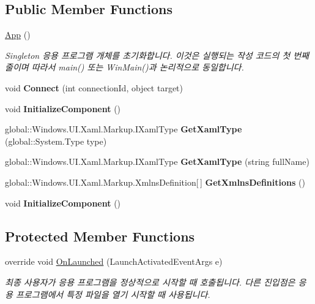 \subsection*{Public Member Functions}
\begin{DoxyCompactItemize}
\item 
\hyperlink{a00015_a1719bb741c5cfb24b6745cd2b9172bd8}{App} ()
\begin{DoxyCompactList}\small\item\em Singleton 응용 프로그램 개체를 초기화합니다. 이것은 실행되는 작성 코드의 첫 번째 줄이며 따라서 main() 또는 Win\+Main()과 논리적으로 동일합니다. \end{DoxyCompactList}\item 
void {\bfseries Connect} (int connection\+Id, object target)\hypertarget{a00015_aa0b90b9ef72df1b4b04b989765843170}{}\label{a00015_aa0b90b9ef72df1b4b04b989765843170}

\item 
void {\bfseries Initialize\+Component} ()\hypertarget{a00015_a8956af89a6c67e881e14444a106aa2a0}{}\label{a00015_a8956af89a6c67e881e14444a106aa2a0}

\item 
global\+::\+Windows.\+U\+I.\+Xaml.\+Markup.\+I\+Xaml\+Type {\bfseries Get\+Xaml\+Type} (global\+::\+System.\+Type type)\hypertarget{a00015_ab857c47c2dd1871550b33aa1db3065d7}{}\label{a00015_ab857c47c2dd1871550b33aa1db3065d7}

\item 
global\+::\+Windows.\+U\+I.\+Xaml.\+Markup.\+I\+Xaml\+Type {\bfseries Get\+Xaml\+Type} (string full\+Name)\hypertarget{a00015_a8bec7c4a0cd7ae2cfcfd21d87b96d308}{}\label{a00015_a8bec7c4a0cd7ae2cfcfd21d87b96d308}

\item 
global\+::\+Windows.\+U\+I.\+Xaml.\+Markup.\+Xmlns\+Definition\mbox{[}$\,$\mbox{]} {\bfseries Get\+Xmlns\+Definitions} ()\hypertarget{a00015_aec8eef3d490b093f325f842569bee9c5}{}\label{a00015_aec8eef3d490b093f325f842569bee9c5}

\item 
void {\bfseries Initialize\+Component} ()\hypertarget{a00015_a8956af89a6c67e881e14444a106aa2a0}{}\label{a00015_a8956af89a6c67e881e14444a106aa2a0}

\end{DoxyCompactItemize}
\subsection*{Protected Member Functions}
\begin{DoxyCompactItemize}
\item 
override void \hyperlink{a00015_aaf786277b3444f9117fd7d14d247d412}{On\+Launched} (Launch\+Activated\+Event\+Args e)
\begin{DoxyCompactList}\small\item\em 최종 사용자가 응용 프로그램을 정상적으로 시작할 때 호출됩니다. 다른 진입점은 응용 프로그램에서 특정 파일을 열기 시작할 때 사용됩니다. \end{DoxyCompactList}\end{DoxyCompactItemize}


